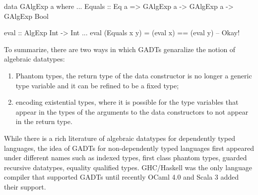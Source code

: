 \documentclass[manuscript,screen,nonacm]{acmart}
\begin{document}
\begin{minipage}[ht]{0.5\linewidth}
\begin{code}
data GAlgExp a where
...
  Equals :: Eq a => GAlgExp a -> GAlgExp a
                 -> GAlgExp Bool
\end{code}
\end{minipage}%
\begin{minipage}[ht]{0.4\linewidth}
\begin{code}
eval :: AlgExp Int -> Int
...
eval (Equals x y) = (eval x) == (eval y) -- Okay!
\end{code}
\end{minipage}

To summarize, there are two ways in which GADTs genaralize the notion of algebraic datatypes:
\begin{enumerate}
\item Phantom types, the return type of the data constructor is no longer a generic type variable and it can be refined to be a fixed type;
\item encoding existential types, where it is possible for the type variables that appear in the types of the arguments to the data constructors to not appear in the return type.
\end{enumerate}

While there is a rich literature of algebraic datatypes for dependently typed languages\cite{TODO}, the idea of GADTs for non-dependently typed languages first appeared under different names such as indexed types\cite{zenger_indexed_1997}, first class phantom types\cite{cheney_first-class_2003}, guarded recursive datatypes\cite{xi_guarded_2003}, equality qualified types\cite{sheard_meta-programming_2008}. GHC/Haskell was the only language compiler that supported GADTs\cite{TODO} until recently OCaml 4.0\cite{TODO} and Scala 3\cite{TODO} added their support.
\end{document}
